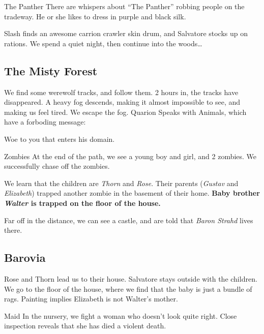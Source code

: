 \documentclass[10pt,twoside,twocolumn]{article}
\begin{document}
\begin{paperbox}{The Panther}
  There are whispers about ``The Panther'' robbing people on the
  tradeway. He or she likes to dress in purple and black silk.
\end{paperbox}

Slash finds an awesome carrion crawler skin drum, and Salvatore stocks
up on rations. We spend a quiet night, then continue into the
woods\ldots

\subsection{The Misty Forest}
We find some werewolf tracks, and follow them. 2 hours in, the tracks
have disappeared. A heavy fog descends, making it almost impossible to
see, and making us feel tired. We escape the fog. Quarion Speaks with
Animals, which have a forboding message:

\begin{quotebox}
  Woe to you that enters his domain.
\end{quotebox}

\begin{monsterbox}{Zombies}
  At the end of the path, we see a young boy and girl, and 2
  zombies. We successfully chase off the zombies.
\end{monsterbox}
We learn that the children are \emph{Thorn} and \emph{Rose}. Their parents
(\emph{Gustav} and \emph{Elizabeth}) trapped another zombie in the basement of
their home. \textbf{Baby brother \emph{Walter} is trapped on the  floor of the house.}

Far off in the distance, we can see a castle, and are told that \emph{Baron
Strahd} lives there.

\subsection{Barovia}
 Rose and Thorn lead us to their
house. Salvatore stays outside with the children. We go to the 
floor of the house, where we find that the baby is just a bundle of
rags. Painting implies Elizabeth is not Walter's mother.

\begin{monsterbox}{Maid}
  In the nursery, we fight a woman who doesn't look quite
  right. Close inspection reveals that she has died a violent death.
\end{monsterbox}
\end{document}
